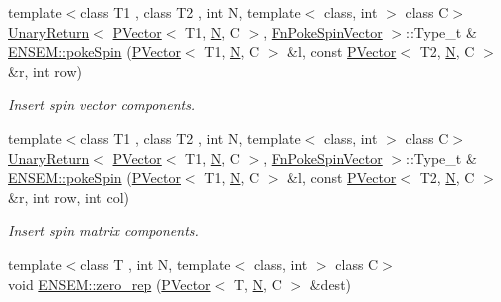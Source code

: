 \begin{DoxyCompactItemize}
{\footnotesize template$<$class T1 , class T2 , int N, template$<$ class, int $>$ class C$>$ }\\\mbox{\hyperlink{structENSEM_1_1UnaryReturn}{Unary\+Return}}$<$ \mbox{\hyperlink{classENSEM_1_1PVector}{P\+Vector}}$<$ T1, \mbox{\hyperlink{operator__name__util_8cc_a7722c8ecbb62d99aee7ce68b1752f337}{N}}, C $>$, \mbox{\hyperlink{structENSEM_1_1FnPokeSpinVector}{Fn\+Poke\+Spin\+Vector}} $>$\+::Type\+\_\+t \& \mbox{\hyperlink{group__primvector_ga10934b73afbfb3796cad8a1208d7ab1d}{E\+N\+S\+E\+M\+::poke\+Spin}} (\mbox{\hyperlink{classENSEM_1_1PVector}{P\+Vector}}$<$ T1, \mbox{\hyperlink{operator__name__util_8cc_a7722c8ecbb62d99aee7ce68b1752f337}{N}}, C $>$ \&l, const \mbox{\hyperlink{classENSEM_1_1PVector}{P\+Vector}}$<$ T2, \mbox{\hyperlink{operator__name__util_8cc_a7722c8ecbb62d99aee7ce68b1752f337}{N}}, C $>$ \&r, int row)
\begin{DoxyCompactList}\small\item\em Insert spin vector components. \end{DoxyCompactList}\item 
{\footnotesize template$<$class T1 , class T2 , int N, template$<$ class, int $>$ class C$>$ }\\\mbox{\hyperlink{structENSEM_1_1UnaryReturn}{Unary\+Return}}$<$ \mbox{\hyperlink{classENSEM_1_1PVector}{P\+Vector}}$<$ T1, \mbox{\hyperlink{operator__name__util_8cc_a7722c8ecbb62d99aee7ce68b1752f337}{N}}, C $>$, \mbox{\hyperlink{structENSEM_1_1FnPokeSpinVector}{Fn\+Poke\+Spin\+Vector}} $>$\+::Type\+\_\+t \& \mbox{\hyperlink{group__primvector_ga89df0ab0f1f2a2f4374c848c2180493f}{E\+N\+S\+E\+M\+::poke\+Spin}} (\mbox{\hyperlink{classENSEM_1_1PVector}{P\+Vector}}$<$ T1, \mbox{\hyperlink{operator__name__util_8cc_a7722c8ecbb62d99aee7ce68b1752f337}{N}}, C $>$ \&l, const \mbox{\hyperlink{classENSEM_1_1PVector}{P\+Vector}}$<$ T2, \mbox{\hyperlink{operator__name__util_8cc_a7722c8ecbb62d99aee7ce68b1752f337}{N}}, C $>$ \&r, int row, int col)
\begin{DoxyCompactList}\small\item\em Insert spin matrix components. \end{DoxyCompactList}\item 
{\footnotesize template$<$class T , int N, template$<$ class, int $>$ class C$>$ }\\void \mbox{\hyperlink{group__primvector_gac04295d27d75b37281c54b208d478624}{E\+N\+S\+E\+M\+::zero\+\_\+rep}} (\mbox{\hyperlink{classENSEM_1_1PVector}{P\+Vector}}$<$ T, \mbox{\hyperlink{operator__name__util_8cc_a7722c8ecbb62d99aee7ce68b1752f337}{N}}, C $>$ \&dest)

\end{DoxyCompactItemize}
